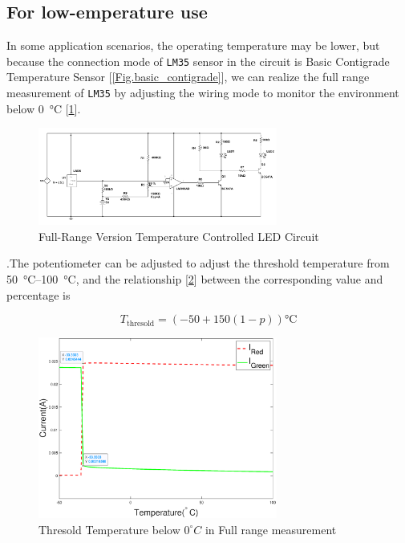\documentclass[12pt]{article}
\numberwithin{equation}{section}
\begin{document}
\subsection{For low-emperature use}
In some application scenarios, the operating temperature may be lower, but because the connection mode of \verb|LM35| sensor in the circuit is Basic Contigrade Temperature Sensor [\ref{Fig.basic_contigrade}], we can realize the full range measurement of \verb|LM35| by adjusting the wiring mode to monitor the environment below \qty{0}{\degreeCelsius} [\ref{Fig.low}].

\begin{figure}[H] %
\centering %
\includegraphics[width=0.7\textwidth]{low_temp} %
\caption{Full-Range Version Temperature Controlled LED Circuit} %
\label{Fig.low} %
\end{figure}



.The potentiometer can be adjusted to adjust the threshold temperature from \qtyrange{50}{100}{\degreeCelsius}, and the relationship [\ref{Fig.low_diagram}] between the corresponding value and percentage is


\begin{equation}
	T_{\text{thresold}}=(-50+150(1-p))\unit{\degreeCelsius}
\end{equation}


\begin{figure}[H] %
\centering %
\includegraphics[width=0.7\textwidth]{low_diagram} %
\caption{Thresold Temperature below $0 ^\circ C$ in Full range measurement} %
\label{Fig.low_diagram} %
\end{figure}
\end{document}
